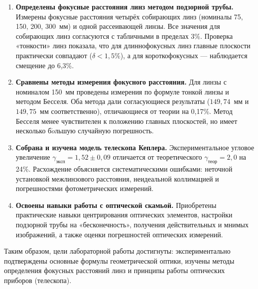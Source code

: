 \documentclass[a4paper]{article}
\begin{document}
\begin{enumerate}
    \item \textbf{Определены фокусные расстояния линз методом подзорной трубы.} Измерены фокусные расстояния четырёх собирающих линз (номиналы 75, 150, 200, 300~мм) и одной рассеивающей линзы. Все значения для собирающих линз согласуются с табличными в пределах 3\%. Проверка «тонкости» линз показала, что для длиннофокусных линз главные плоскости практически совпадают ($\delta < 1{,}5\%$), а для короткофокусных — наблюдается смещение до 6,3\%.
    
    \item \textbf{Сравнены методы измерения фокусного расстояния.} Для линзы с номиналом 150~мм проведены измерения по формуле тонкой линзы и методом Бесселя. Оба метода дали согласующиеся результаты ($149{,}74$~мм и $149{,}75$~мм соответственно), отличающиеся от теории на 0,17\%. Метод Бесселя менее чувствителен к положению главных плоскостей, но имеет несколько б$\acute{o}$льшую случайную погрешность.
    
    \item \textbf{Собрана и изучена модель телескопа Кеплера.} Экспериментальное угловое увеличение $\gamma_\text{эксп} = 1{,}52 \pm 0{,}09$ отличается от теоретического $\gamma_\text{теор} = 2{,}0$ на 24\%. Расхождение объясняется систематическими ошибками: неточной установкой межлинзового расстояния, неидеальной коллимацией и погрешностями фотометрических измерений.
    
    \item \textbf{Освоены навыки работы с оптической скамьой.} Приобретены практические навыки центрирования оптических элементов, настройки подзорной трубы на «бесконечность», получения действительных и мнимых изображений, а также оценки погрешностей оптических измерений.
\end{enumerate}

Таким образом, цели лабораторной работы достигнуты: экспериментально подтверждены основные формулы геометрической оптики, изучены методы определения фокусных расстояний линз и принципы работы оптических приборов (телескопа).
\end{document}
